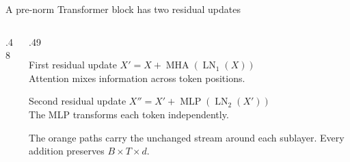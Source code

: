 \documentclass[handout]{beamer}
\begin{document}
\begin{frame}{A pre-norm Transformer block has two residual updates}
\begin{columns}[c]
\begin{column}{.48\linewidth}
    \end{column}
    \begin{column}{.49\linewidth}
      \footnotesize
      \begin{block}{First residual update}
        $X'=X+\operatorname{MHA}(\operatorname{LN}_1(X))$\\[4pt]
        Attention mixes information across token positions.
      \end{block}
      \begin{block}{Second residual update}
        $X''=X'+\operatorname{MLP}(\operatorname{LN}_2(X'))$\\[4pt]
        The MLP transforms each token independently.
      \end{block}
      The orange paths carry the unchanged stream around each sublayer. Every addition preserves $B\times T\times d$.
    \end{column}
  \end{columns}
\end{frame}
\end{document}
